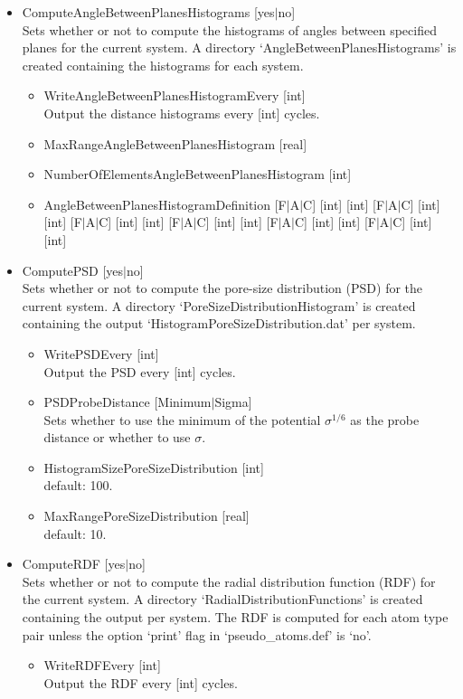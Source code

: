 \begin{itemize}
\item{ComputeAngleBetweenPlanesHistograms [yes$|$no]}\\
Sets whether or not to compute the histograms of angles between specified planes for the current system.
A directory `AngleBetweenPlanesHistograms' is created containing the histograms for each system.
\begin{itemize}
\item{WriteAngleBetweenPlanesHistogramEvery [int]}\\
Output the distance histograms every [int] cycles.
\item{MaxRangeAngleBetweenPlanesHistogram [real]}\\
\item{NumberOfElementsAngleBetweenPlanesHistogram [int]}\\
\item{AngleBetweenPlanesHistogramDefinition [F$|$A$|$C] [int] [int] [F$|$A$|$C] [int] [int] [F$|$A$|$C] [int] [int]
        [F$|$A$|$C] [int] [int] [F$|$A$|$C] [int] [int] [F$|$A$|$C] [int] [int]}\\
\end{itemize}


\item{ComputePSD [yes$|$no]}\\
Sets whether or not to compute the pore-size distribution (PSD) for the current system.
A directory `PoreSizeDistributionHistogram' is created containing the output 
`HistogramPoreSizeDistribution.dat' per system.
\begin{itemize}
\item{WritePSDEvery [int]}\\
Output the PSD every [int] cycles.
\item{PSDProbeDistance [Minimum$|$Sigma]}\\
Sets whether to use the minimum of the potential $\sigma^{1/6}$ as the probe distance or whether to use $\sigma$.
\item{HistogramSizePoreSizeDistribution [int]}\\
default: 100.
\item{MaxRangePoreSizeDistribution [real]}\\
default: 10.
\end{itemize}


\item{ComputeRDF [yes$|$no]}\\
Sets whether or not to compute the radial distribution function (RDF) for the current system.
A directory `RadialDistributionFunctions' is created containing the output per system.
The RDF is computed for each atom type pair unless the option `print' flag in `pseudo\_atoms.def'
is `no'.
\begin{itemize}
\item{WriteRDFEvery [int]}\\
Output the RDF every [int] cycles.
\end{itemize}


\end{itemize}
